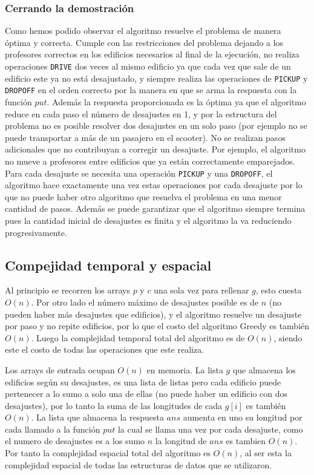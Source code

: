 \documentclass[11pt]{article}
\begin{document}
    \subsubsection{Cerrando la demostración}
    Como hemos podido observar el algoritmo resuelve el problema de manera óptima y correcta. Cumple con las restricciones del
    problema dejando a los profesores correctos en los edificios necesarios al final de la ejecución, no realiza operaciones
    \texttt{DRIVE} dos veces al mismo edificio ya que cada vez que sale de un edificio este ya no está desajustado, y siempre realiza
    las operaciones de \texttt{PICKUP} y \texttt{DROPOFF} en el orden correcto por la manera en que se arma la respuesta con la
    función $put$. Además la respuesta proporcionada es la óptima ya que el algoritmo reduce en cada paso el número de desajustes en 
    1, y por la estructura del problema no es posible resolver dos desajustes en un solo paso (por ejemplo no se puede transportar a 
    más de un pasajero en el scooter). No se realizan pasos adicionales que no contribuyan a corregir un desajuste. Por ejemplo, el 
    algoritmo no mueve a profesores entre edificios que ya están correctamente emparejados. Para cada desajuste se necesita una
    operación \texttt{PICKUP} y una \texttt{DROPOFF}, el algoritmo hace exactamente una vez estas operaciones por cada desajuste
    por lo que no puede haber otro algoritmo que resuelva el problema en una menor cantidad de pasos. Además se puede garantizar
    que el algoritmo siempre termina pues la cantidad inicial de desajustes es finita y el algoritmo la va reduciendo progresivamente.

    \subsection{Compejidad temporal y espacial}
    Al principio se recorren los arrays $p$ y $c$ una sola vez para rellenar $g$, esto cuesta $O(n)$. Por otro lado el número máximo 
    de desajustes posible es de $n$ (no pueden haber más desajustes que edificios), y el algoritmo resuelve un desajuste por paso y no 
    repite edificios, por lo que el costo del algoritmo Greedy es también $O(n)$. Luego la complejidad temporal total del algoritmo es 
    de $O(n)$, siendo este el costo de todas las operaciones que este realiza.

    Los arrays de entrada ocupan $O(n)$ en memoria. La lista $g$ que almacena los edificios según su desajustes, es una
    lista de listas pero cada edificio puede pertenecer a lo sumo a solo una de ellas (no puede haber un edificio con
    dos desajustes), por lo tanto la suma de las longitudes de cada $g[i]$ es también $O(n)$. La lista que almacena la respuesta
    $ans$ aumenta en uno su longitud por cada llamado a la función $put$ la cual se llama una vez por cada desajuste, como el
    numero de desajustes es a los sumo $n$ la longitud de $ans$ es tambien $O(n)$. Por tanto la complejidad espacial total
    del algoritmo es $O(n)$, al ser esta la complejidad espacial de todas las estructuras de datos que se utilizaron.
\end{document}

